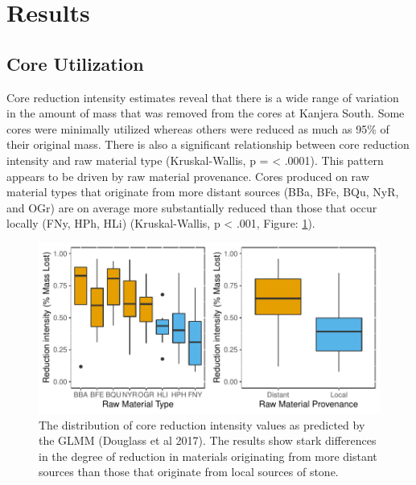 \documentclass[]{elsarticle} %
\makeatletter
\def\maxwidth{\ifdim\Gin@nat@width>\linewidth\linewidth
\else\Gin@nat@width\fi}
\let\Oldincludegraphics\includegraphics
\renewcommand{\includegraphics}[1]{\Oldincludegraphics[width=\maxwidth]{#1}}
\makeatother
\begin{document}
\hypertarget{results}{%
\section{Results}\label{results}}

\hypertarget{core-utilization}{%
\subsection{Core Utilization}\label{core-utilization}}

Core reduction intensity estimates reveal that there is a wide range of
variation in the amount of mass that was removed from the cores at
Kanjera South. Some cores were minimally utilized whereas others were
reduced as much as 95\% of their original mass. There is also a
significant relationship between core reduction intensity and raw
material type (Kruskal-Wallis, p = \textless{} .0001). This pattern
appears to be driven by raw material provenance. Cores produced on raw
material types that originate from more distant sources (BBa, BFe, BQu,
NyR, and OGr) are on average more substantially reduced than those that
occur locally (FNy, HPh, HLi) (Kruskal-Wallis, p \textless{} .001,
Figure: \ref{core_redux_rm}).

\begin{figure}
\centering
\includegraphics{Reeves_Braun_et_al_2020_Kanjera_South_JHE_files/figure-latex/fig-4-1.pdf}
\caption{The distribution of core reduction intensity values as
predicted by the GLMM (Douglass et al 2017). The results show stark
differences in the degree of reduction in materials originating from
more distant sources than those that originate from local sources of
stone. \label{core_redux_rm}}
\end{figure}
\end{document}
